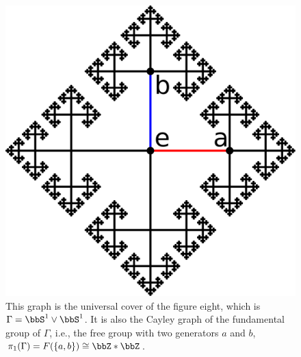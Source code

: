 \begin{figure}[tp]
    \centering
        \includegraphics[scale=0.15]{figures/Cayley.pdf}
    \caption{This graph is the universal cover of the figure eight, which is $\Gamma=\bbS^1 \vee \bbS^1$. It is also the Cayley graph of the fundamental group of $\Gamma$, i.e., the free group with two generators $a$ and $b$, $\pi_1(\Gamma)=F(\{a,b\})\cong\bbZ\ast\bbZ$. \label{Fig. Cayley}}
\end{figure}

